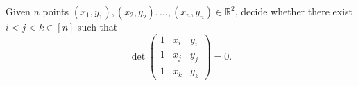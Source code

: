 \begin{problem}
	Given \(n\) points \((x_1,y_1), (x_2,y_2), \ldots, (x_n,y_n) \in \mathbb{R}^2\), decide
	whether there exist \(i < j < k \in [n]\) such that
	\begin{displaymath}
		\det
		\left(
		\begin{matrix}
		1 & x_i & y_i \\
		1 & x_j & y_j \\
		1 & x_k & y_k
		\end{matrix}
		\right)
		= 0.
	\end{displaymath}
\end{problem}
